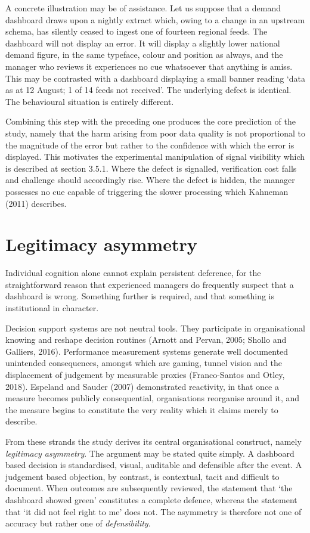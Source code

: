 \documentclass[12pt,a4paper]{article}
\begin{document}
A concrete illustration may be of assistance. Let us suppose that a demand dashboard draws upon a
nightly extract which, owing to a change in an upstream schema, has silently ceased to ingest one
of fourteen regional feeds. The dashboard will not display an error. It will display a slightly
lower national demand figure, in the same typeface, colour and position as always, and the manager
who reviews it experiences no cue whatsoever that anything is amiss. This may be contrasted with a
dashboard displaying a small banner reading `data as at 12 August; 1 of 14 feeds not received'.
The underlying defect is identical. The behavioural situation is entirely different.

Combining this step with the preceding one produces the core prediction of the study, namely that the harm
arising from poor data quality is not proportional to the magnitude of the error but rather to the
confidence with which the error is displayed. This motivates the experimental manipulation of signal
visibility which is described at section 3.5.1. Where the defect is signalled, verification cost falls and
challenge should accordingly rise. Where the defect is hidden, the manager possesses no cue capable of
triggering the slower processing which Kahneman (2011) describes.

\section{Legitimacy asymmetry}

Individual cognition alone cannot explain persistent deference, for the straightforward reason that
experienced managers do frequently suspect that a dashboard is wrong. Something further is required, and
that something is institutional in character.

Decision support systems are not neutral tools. They participate in organisational knowing and
reshape decision routines (Arnott and Pervan, 2005; Shollo and Galliers, 2016). Performance
measurement systems generate well documented unintended consequences, amongst which are gaming,
tunnel vision and the displacement of judgement by measurable proxies (Franco-Santos and Otley,
2018). Espeland and Sauder (2007) demonstrated reactivity, in that once a measure becomes publicly
consequential, organisations reorganise around it, and the measure begins to constitute the very
reality which it claims merely to describe.

From these strands the study derives its central organisational construct, namely \emph{legitimacy
asymmetry}. The argument may be stated quite simply. A dashboard based decision is standardised, visual,
auditable and defensible after the event. A judgement based objection, by contrast, is contextual, tacit
and difficult to document. When outcomes are subsequently reviewed, the statement that `the dashboard
showed green' constitutes a complete defence, whereas the statement that `it did not feel right to me' does
not. The asymmetry is therefore not one of accuracy but rather one of \emph{defensibility}.
\end{document}

